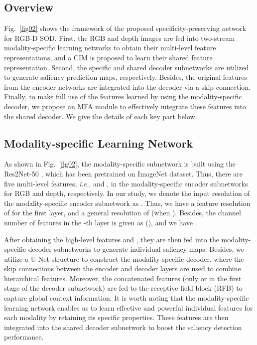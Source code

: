 \documentclass[10pt,twocolumn,letterpaper]{article}
\def\ie{\emph{i.e.}}
\begin{document}
\subsection{Overview}
\label{sec3.1}

Fig.~\ref{fig02} shows the framework of the proposed specificity-preserving network for RGB-D SOD. First, the RGB and depth images are fed into two-stream modality-specific learning networks to obtain their multi-level feature representations, and a CIM is proposed to learn their shared feature representation. Second, the specific and shared decoder subnetworks are utilized to generate saliency prediction maps, respectively. Besides, the original features from the encoder networks are integrated into the decoder via a skip connection. Finally, to make full use of the features learned by using the modality-specific decoder, we propose an MFA module to effectively integrate these features into the shared decoder. We give the details of each key part below.


\subsection{Modality-specific Learning Network}
\label{sec3.2}

As shown in Fig.~\ref{fig02}, the modality-specific subnetwork is built using the Res2Net-50 \cite{pami20Res2net}, which has been pretrained on ImageNet \cite{russakovsky2015imagenet} dataset. Thus, there are five multi-level features, \ie,  and , in the modality-specific encoder subnetworks for RGB and depth, respectively. In our study, we denote the input resolution of the modality-specific encoder subnetwork as . Thus, we have a feature resolution of  for the first layer, and a general resolution of  (when ). Besides, the channel number of features in the -th layer is given as  (), and we have .

After obtaining the high-level features  and , they are then fed into the modality-specific decoder subnetworks to generate individual saliency maps. Besides, we utilize a U-Net \cite{ronneberger2015u} structure to construct the modality-specific decoder, where the skip connections between the encoder and decoder layers are used to combine hierarchical features. Moreover, the concatenated features (only  or  in the first stage of the decoder subnetwork) are fed to the receptive field block (RFB) \cite{wu2019cascaded} to capture global context information. It is worth noting that the modality-specific learning network enables us to learn effective and powerful individual features for each modality by retaining its specific properties. These features are then integrated into the shared decoder subnetwork to boost the saliency detection performance.
\end{document}
